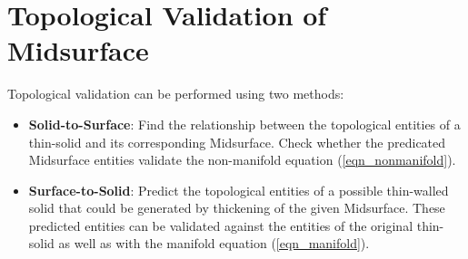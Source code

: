 \section{Topological Validation of Midsurface}

Topological validation can be performed using two methods:
\begin{itemize}
[noitemsep,topsep=2pt,parsep=2pt,partopsep=2pt]
\item \textbf{Solid-to-Surface}: Find the relationship between the topological entities of a thin-solid and its corresponding Midsurface. Check whether the predicated Midsurface entities validate the non-manifold equation (\ref{eqn_nonmanifold}).
\item  \textbf{Surface-to-Solid}: Predict the topological entities of a possible thin-walled solid that could be generated by thickening of the given Midsurface.  These predicted entities can be validated against the entities of the original thin-solid as well as with the manifold equation (\ref{eqn_manifold}).
\end{itemize}


